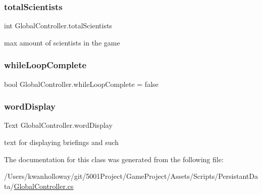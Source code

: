 \mbox{\label{class_global_controller_ad02eba986e29262743629b40f12372e7}} 
\subsubsection{\texorpdfstring{total\+Scientists}{totalScientists}}
{\footnotesize\ttfamily int Global\+Controller.\+total\+Scientists}



max amount of scientists in the game 

\mbox{\label{class_global_controller_a60806c4e71e7aab4127aca365a359b2d}} 
\subsubsection{\texorpdfstring{while\+Loop\+Complete}{whileLoopComplete}}
{\footnotesize\ttfamily bool Global\+Controller.\+while\+Loop\+Complete = false}

\mbox{\label{class_global_controller_a8140e86b843db24566ec5fbf223eeafa}} 
\subsubsection{\texorpdfstring{word\+Display}{wordDisplay}}
{\footnotesize\ttfamily Text Global\+Controller.\+word\+Display}



text for displaying briefings and such 



The documentation for this class was generated from the following file\+:\begin{DoxyCompactItemize}
\item 
/\+Users/kwanholloway/git/5001\+Project/\+Game\+Project/\+Assets/\+Scripts/\+Persistant\+Data/\hyperlink{_global_controller_8cs}{Global\+Controller.\+cs}\end{DoxyCompactItemize}
